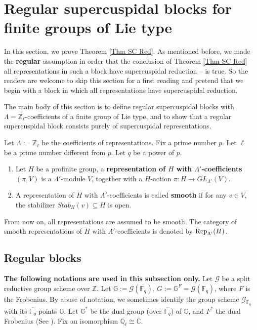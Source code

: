 		
		
		
		\section{Regular supercuspidal blocks for finite groups of Lie type}\label{Sec Reg Cusp}
		
		In this section, we prove Theorem \ref{Thm SC Red}. As mentioned before, we made the \textbf{regular} assumption in order that the conclusion of Theorem \ref{Thm SC Red} -- all representations in such a block have supercuspidal reduction -- is true. So the readers are welcome to skip this section for a first reading and pretend that we begin with a block in which all representations have supercuspidal reduction.
		
		The main body of this section is to define regular supercuspidal blocks with $\Lambda=\overline{\mathbb{Z}_{\ell}}$-coefficients of a finite group of Lie type, and to show that a regular supercuspidal block consists purely of supercuspidal representations.
		
		Let $\Lambda:=\overline{\mathbb{Z}_{\ell}}$ be the coefficients of representations. Fix a prime number $p$. Let $\ell$ be a prime number different from $p$. Let $q$ be a power of $p$.
		
		\begin{definition}
			\begin{enumerate}Let $\Lambda'$ be any ring.
				\item Let $H$ be a profinite group, a \textbf{representation of $H$ with $\Lambda'$-coefficients} $(\pi, V)$ is a $\Lambda'$-module $V$, together with a $H$-action $\pi: H \to GL_{\Lambda'}(V)$.
				\item A representation of $H$ with $\Lambda'$-coefficients is called \textbf{smooth} if for any $v \in V$, the stabilizer $Stab_H(v) \subseteq H$ is open.
			\end{enumerate}
		\end{definition}
		
		From now on, all representations are assumed to be smooth. The category of smooth representations of $H$ with $\Lambda'$-coefficients is denoted by $\operatorname{\operatorname{Rep}}_{\Lambda'}(H)$.
		
		\subsection{Regular blocks}
		
		\textbf{The following notations are used in this subsection only.} Let $\mathcal{G}$ be a split reductive group scheme over $\mathbb{Z}$. Let $\mathbb{G}:=\mathcal{G}(\overline{\mathbb{F}_q})$, $G:=\mathbb{G}^F=\mathcal{G}(\mathbb{F}_q)$, where $F$ is the Frobenius. By abuse of notation, we sometimes identify the group scheme $\mathcal{G}_{\overline{\mathbb{F}_q}}$ with its $\overline{\mathbb{F}_q}$-points $\mathbb{G}$. Let $\mathbb{G}^*$ be the dual group (over $\overline{\mathbb{F}_q}$) of $\mathbb{G}$, and $F^*$ the dual Frobenius (See \cite[Section 4.2]{carter1985finite}). Fix an isomorphism $\overline{\mathbb{Q}_{\ell}} \cong \mathbb{C}$. 
		

